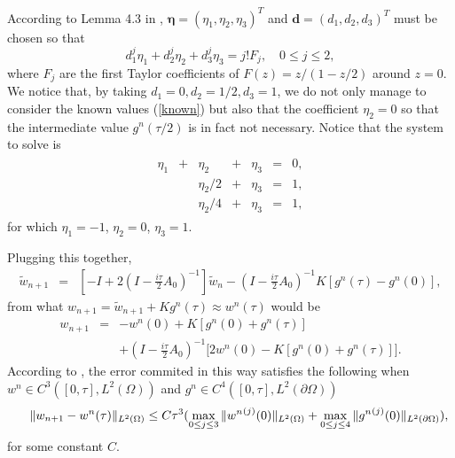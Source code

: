 \documentclass[a4paper,12pt]{article}
\begin{document}
According to Lemma 4.3 in \cite{AP}, $\boldsymbol{\eta}=(\eta_1,\eta_2,\eta_3)^T$ and $\mathbf{d}=(d_1,d_2,d_3)^T$ must be chosen so that
$$
d_1^j\eta_1+d_2^j \eta_2+d_3^j \eta_3=j! F_j, \quad 0 \le j \le 2,
$$
where $F_j$ are the first Taylor coefficients of $F(z)=z/(1-z/2)$ around $z=0$. We notice that, by taking $d_1=0, d_2=1/2, d_3=1$, we do not only manage to consider the known values (\ref{known}) but also that the coefficient $\eta_2=0$ so that the intermediate value $g^n(\tau/2)$ is in fact not necessary. Notice that the system to solve is
\begin{eqnarray}
\begin{array}{ccccccc}
\eta_1&+&\eta_2&+&\eta_3&=&0,  \\
&&  \eta_2/2&+&\eta_3&=&1,  \\
&& \eta_2/4 &+&\eta_3&=&1,
\end{array}
\end{eqnarray}
for which $\eta_1=-1$, $\eta_2=0$, $\eta_3=1$.

Plugging this together,
\begin{eqnarray}
\tilde{w}_{n+1}&=&[-I+2(I-\frac{i \tau}{2}A_0)^{-1}]\tilde{w}_n- (I-\frac{i \tau}{2}A_0)^{-1}K [g^n(\tau)-g^n(0)],
\nonumber
\end{eqnarray}
from what $w_{n+1}=\tilde{w}_{n+1}+K g^n(\tau) \approx w^n(\tau)$ would be
\begin{eqnarray}
w_{n+1}&=&-w^n(0)+K [g^n(0)+g^n(\tau)]
\nonumber \\
&&+(I-\frac{i \tau}{2} A_0)^{-1}\bigg[2 w^n(0)- K[g^n(0)+g^n(\tau)]\bigg].
\label{wn1}
\end{eqnarray}
According to \cite{ACP}, the error commited in this way satisfies the following when $w^n \in C^3([0,\tau],L^2(\Omega))$ and $g^n \in C^4([0,\tau],L^2(\partial \Omega))$
\begin{eqnarray}
\hspace{0.5cm}\|w_{n+1}-w^n(\tau)\|_{L^2(\Omega)}\le C \tau^3 (\max_{0\le j \le 3} \|{w^n}^{(j)}(0)\|_{L^2(\Omega)}+\max_{0\le j \le 4} \|{g^n}^{(j)}(0)\|_{L^2(\partial \Omega)}), \label{erlocmp}
\end{eqnarray}
for some constant $C$.
\end{document}
